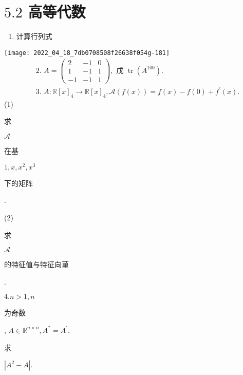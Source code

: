 \documentclass[10pt]{article}
\begin{document}
\section{$5.2$ 高等代数}
\begin{enumerate}
  \item \begin{CJK}{UTF8}{mj}计算行列式\end{CJK}
\end{enumerate}
\texttt{[image: 2022\_04\_18\_7db0708508f26638f054g-181]}
$$
\begin{aligned}
&\text { 2. } A=\left(\begin{array}{ccc}
2 & -1 & 0 \\
1 & -1 & 1 \\
-1 & -1 & 1
\end{array}\right), \text { 戊 } \operatorname{tr}\left(A^{100}\right) . \\
&\text { 3. } A: \mathbb{R}[x]_{4} \rightarrow \mathbb{R}[x]_{4}, \mathscr{A}(f(x))=f(x)-f(0)+f^{\prime}(x) .
\end{aligned}
$$
(1)\begin{CJK}{UTF8}{mj}求\end{CJK} $\mathscr{A}$ \begin{CJK}{UTF8}{mj}在基\end{CJK} $1, x, x^{2}, x^{3}$ \begin{CJK}{UTF8}{mj}下的矩阵\end{CJK}.

(2) \begin{CJK}{UTF8}{mj}求\end{CJK} $\mathscr{A}$ \begin{CJK}{UTF8}{mj}的特征值与特征向荲\end{CJK}.

$4 . n>1, n$ \begin{CJK}{UTF8}{mj}为奇数\end{CJK}, $A \in \mathbb{R}^{n \times n}, A^{*}=A^{\prime}$. \begin{CJK}{UTF8}{mj}求\end{CJK} $\left|A^{2}-A\right|$.
\end{document}
